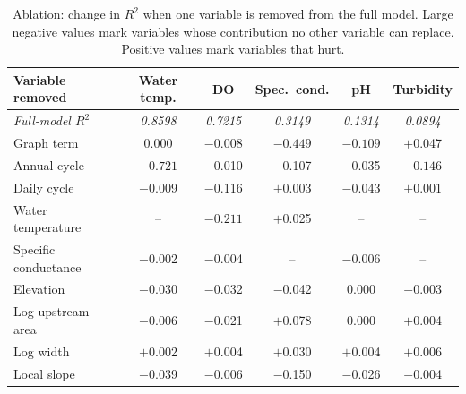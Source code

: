 \documentclass[11pt]{article}
\begin{document}
\begin{table}[h]
\centering
\small
\caption{Ablation: change in $R^2$ when one variable is removed from the full model. Large negative
values mark variables whose contribution no other variable can replace. Positive values mark variables
that hurt.}
\label{tab:ablation}
\begin{tabular}{l c c c c c}
\toprule
Variable removed & {Water temp.} & {DO} & {Spec.\ cond.} & {pH} & {Turbidity} \\
\midrule
\emph{Full-model $R^2$} & \emph{0.8598} & \emph{0.7215} & \emph{0.3149} & \emph{0.1314} & \emph{0.0894} \\
\midrule
Graph term           & 0.000      & $-$0.008 & $\mathbf{-0.449}$ & $\mathbf{-0.109}$ & $+$0.047 \\
Annual cycle         & $\mathbf{-0.721}$ & $-$0.010 & $-$0.107 & $-$0.035 & $\mathbf{-0.146}$ \\
Daily cycle          & $-$0.009   & $-$0.116 & $+$0.003 & $-$0.043 & $+$0.001 \\
Water temperature    & --         & $\mathbf{-0.211}$ & $+$0.025 & --       & --       \\
Specific conductance & $-$0.002   & $-$0.004 & --       & $-$0.006 & --       \\
Elevation            & $-$0.030   & $-$0.032 & $-$0.042 & 0.000    & $-$0.003 \\
Log upstream area    & $-$0.006   & $-$0.021 & $+$0.078 & 0.000    & $+$0.004 \\
Log width            & $+$0.002   & $+$0.004 & $+$0.030 & $+$0.004 & $+$0.006 \\
Local slope          & $-$0.039   & $-$0.006 & $-$0.150 & $-$0.026 & $-$0.004 \\
\bottomrule
\end{tabular}
\end{table}
\end{document}
